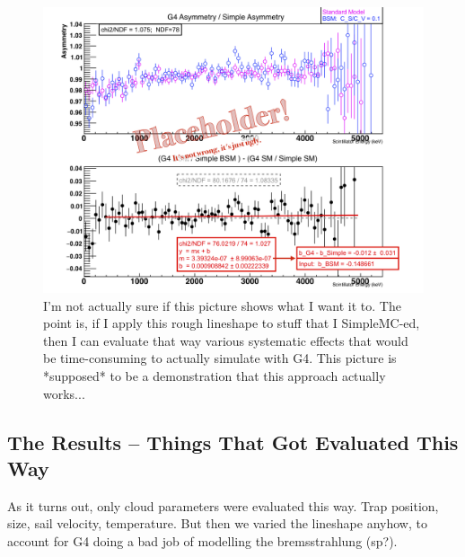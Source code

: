     \begin{figure}[h!!!t]
    	\centering
    	\includegraphics[width=.999\linewidth]
    	{Figures/LineshapeDemo_prelim.png}
    	\caption[Lineshape Comparison]{I'm not actually sure if this picture shows what I want it to.  The point is, if I apply this rough lineshape to stuff that I SimpleMC-ed, then I can evaluate that way various systematic effects that would be time-consuming to actually simulate with G4.  This picture is  *supposed* to be a demonstration that this approach actually works... }    	\label{fig:lineshape_demo}
    \end{figure}
	
	
	\subsection{The Results -- Things That Got Evaluated This Way}
	As it turns out, only cloud parameters were evaluated this way. 
Trap position, size, sail velocity, temperature.  But then we varied the lineshape anyhow, to account for G4 doing a bad job of modelling the bremsstrahlung (sp?).
	
